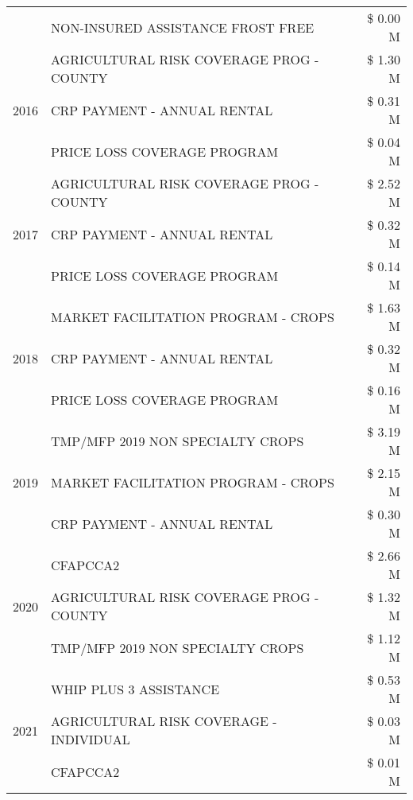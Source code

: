 \begin{tabular}{llr}
 & NON-INSURED ASSISTANCE FROST FREE & \$ 0.00 M \\
\cline{1-3}
\multirow[t]{3}{*}{2016} & AGRICULTURAL RISK COVERAGE PROG - COUNTY      & \$ 1.30 M \\
 & CRP PAYMENT - ANNUAL RENTAL                   & \$ 0.31 M \\
 & PRICE LOSS COVERAGE PROGRAM                   & \$ 0.04 M \\
\cline{1-3}
\multirow[t]{3}{*}{2017} & AGRICULTURAL RISK COVERAGE PROG - COUNTY & \$ 2.52 M \\
 & CRP PAYMENT - ANNUAL RENTAL & \$ 0.32 M \\
 & PRICE LOSS COVERAGE PROGRAM & \$ 0.14 M \\
\cline{1-3}
\multirow[t]{3}{*}{2018} & MARKET FACILITATION PROGRAM - CROPS & \$ 1.63 M \\
 & CRP PAYMENT - ANNUAL RENTAL & \$ 0.32 M \\
 & PRICE LOSS COVERAGE PROGRAM & \$ 0.16 M \\
\cline{1-3}
\multirow[t]{3}{*}{2019} & TMP/MFP 2019 NON SPECIALTY CROPS & \$ 3.19 M \\
 & MARKET FACILITATION PROGRAM - CROPS & \$ 2.15 M \\
 & CRP PAYMENT - ANNUAL RENTAL & \$ 0.30 M \\
\cline{1-3}
\multirow[t]{3}{*}{2020} & CFAPCCA2 & \$ 2.66 M \\
 & AGRICULTURAL RISK COVERAGE PROG - COUNTY & \$ 1.32 M \\
 & TMP/MFP 2019 NON SPECIALTY CROPS & \$ 1.12 M \\
\cline{1-3}
\multirow[t]{3}{*}{2021} & WHIP PLUS 3 ASSISTANCE & \$ 0.53 M \\
 & AGRICULTURAL RISK COVERAGE - INDIVIDUAL & \$ 0.03 M \\
 & CFAPCCA2 & \$ 0.01 M \\
\cline{1-3}
\bottomrule
\end{tabular}
